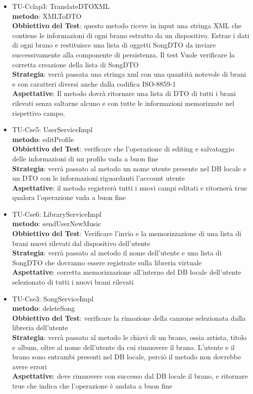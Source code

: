 \begin{itemize}
\item TU-Cclap3:  TranslateDTOXML\\
\textbf{metodo}: XMLToDTO\\
\textbf{Obbiettivo del Test}: questo metodo riceve in input una stringa XML che
contiene le informazioni di ogni brano estratto da un dispositivo. Estrae i
dati di ogni brano e restituisce una lista di oggetti SongDTO da inviare successivamente alla componente di persistenza. Il test Vuole verificare la corretta creazione della lista di SongDTO\\
\textbf{Strategia}: verr\`a passata una stringa xml con una quantit\`a
notevole di brani e con caratteri diversi anche dalla codifica ISO-8859-1\\
\textbf{Aspettative}: Il metodo dovr\`a ritornare una lista
di DTO di tutti i brani rilevati senza saltarne alcuno e con tutte le informazioni memorizzate nel
rispettivo campo.\\


\item TU-Cse5:  UserServiceImpl\\
\textbf{metodo}: editProfile\\
\textbf{Obbiettivo del Test}: verificare che l'operazione di editing e
salvataggio delle informazioni di un profilo vada a buon fine\\
\textbf{Strategia}: verr\`a passato al metodo un nome utente presente nel DB
locale e un DTO con le informazioni riguardanti l'account utente\\
\textbf{Aspettative}: il metodo registrer\`a tutti i nuovi campi editati e
ritorner\`a true qualora l'operazione vada a buon fine\\

\item TU-Cse6: LibraryServiceImpl\\
\textbf{metodo}: sendUserNewMusic\\
\textbf{Obbiettivo del Test}: Verificare l'invio e la memorizzazione di una lista di
brani nuovi rilevati dal dispositivo dell'utente\\ 
\textbf{Strategia}: verr\`a passato al metodo il nome dell'utente e una lista
di SongDTO che dovranno essere registrate sulla libreria virtuale\\
\textbf{Aspettative}: corretta memorizzazione all'interno del DB
locale dell'utente selezionato di tutti i nuovi brani rilevati\\

\item TU-Cse3: SongServiceImpl\\
\textbf{metodo}: deleteSong\\
\textbf{Obbiettivo del Test}: verificare la rimozione della canzone
selezionata dalla libreria dell'utente\\
\textbf{Strategia}: verr\`a passato al metodo le chiavi di un brano, ossia
artista, titolo e album, oltre al nome dell'utente da cui rimuovere il brano.
L'utente e il brano sono entrambi presenti nel DB locale, perci\`o il metodo
non dovrebbe avere errori\\
\textbf{Aspettative}: deve rimuovere con successo dal DB locale il brano, e
ritornare true che indica che l'operazione \`e andata a buon fine


\end{itemize}
